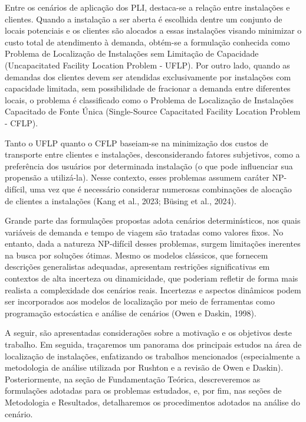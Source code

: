 \documentclass[12pt]{article}
\begin{document}
Entre os cenários de aplicação dos PLI, destaca-se a relação entre instalações e clientes. Quando a instalação a ser aberta é escolhida dentre um conjunto de locais potenciais e os clientes são alocados a essas instalações visando minimizar o custo total de atendimento à demanda, obtém-se a formulação conhecida como Problema de Localização de Instalações sem Limitação de Capacidade (Uncapacitated Facility Location Problem - UFLP). Por outro lado, quando as demandas dos clientes devem ser atendidas exclusivamente por instalações com capacidade limitada, sem possibilidade de fracionar a demanda entre diferentes locais, o problema é classificado como o Problema de Localização de Instalações Capacitado de Fonte Única (Single-Source Capacitated Facility Location Problem - CFLP).

Tanto o UFLP quanto o CFLP baseiam-se na minimização dos custos de transporte entre clientes e instalações, desconsiderando fatores subjetivos, como a preferência dos usuários por determinada instalação (o que pode influenciar sua propensão a utilizá-la). Nesse contexto, esses problemas assumem caráter NP-difícil, uma vez que é necessário considerar numerosas combinações de alocação de clientes a instalações (Kang et al., 2023; Büsing et al., 2024).

Grande parte das formulações propostas adota cenários determinísticos, nos quais variáveis de demanda e tempo de viagem são tratadas como valores fixos. No entanto, dada a natureza NP-difícil desses problemas, surgem limitações inerentes na busca por soluções ótimas. Mesmo os modelos clássicos, que fornecem descrições generalistas adequadas, apresentam restrições significativas em contextos de alta incerteza ou dinamicidade, que poderiam refletir de forma mais realista a complexidade dos cenários reais. Incertezas e aspectos dinâmicos podem ser incorporados aos modelos de localização por meio de ferramentas como programação estocástica e análise de cenários (Owen e Daskin, 1998).

A seguir, são apresentadas considerações sobre a motivação e os objetivos deste trabalho. Em seguida, traçaremos um panorama dos principais estudos na área de localização de instalações, enfatizando os trabalhos mencionados (especialmente a metodologia de análise utilizada por Rushton e a revisão de Owen e Daskin). Posteriormente, na seção de Fundamentação Teórica, descreveremos as formulações adotadas para os problemas estudados, e, por fim, nas seções de Metodologia e Resultados, detalharemos os procedimentos adotados na análise do cenário.
\end{document}

